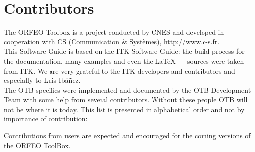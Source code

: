 \chapter{Contributors}
\noindent

The ORFEO Toolbox is a project conducted by CNES and developed in
cooperation with CS (Communication \& Syst\`{e}mes), \url{http://www.c-s.fr}.\\

This Software Guide is based on the ITK Software Guide: the build
process for the documentation, many examples and even the \LaTeX~ ~
sources were taken from ITK. We are very grateful to the ITK
developers and contributors and especially to Luis Ib\'a\~nez.\\

The OTB specifics were implemented and documented by the OTB Development Team
with some help from several contributors. Without these people OTB will not be
where it is today. This list is presented in alphabetical order and not by
importance of contribution:



Contributions from users are expected and encouraged for the coming
versions of the ORFEO ToolBox.

